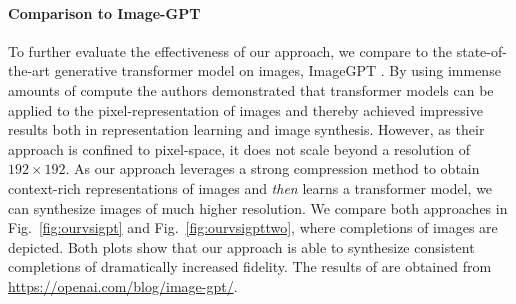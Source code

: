 \documentclass[final]{cvpr}
\begin{document}
\paragraph{Comparison to Image-GPT}
To further evaluate the effectiveness of our approach, we compare to the state-of-the-art generative transformer model on images, ImageGPT \cite{chen2020generative}. By using immense amounts of compute the authors demonstrated that transformer models can be applied to the pixel-representation of images and thereby achieved impressive results both in representation learning and image synthesis. However, as their approach is confined to pixel-space, it does not scale beyond a resolution of $192 \times 192$.
As our approach leverages a strong compression method to obtain context-rich representations of images and \emph{then} learns a transformer model, we can synthesize images of much higher resolution. We compare both approaches in Fig.~\ref{fig:ourvsigpt} and Fig.~\ref{fig:ourvsigpttwo}, where completions of images are depicted. Both plots show that our approach is able to synthesize consistent completions of dramatically increased fidelity. The results of \cite{chen2020generative} are obtained from \url{https://openai.com/blog/image-gpt/}.


\cinqualitativetwo
\cinqualitativethree
\cinqualitativebirds
\cinqualitativeone


\rejectioncin
\topkcin
\toppcin

\cinbatchthree
\cinbatchsix
\cinbatchone
\cinbatchtwo
\cinbatchfour
\cinbatchfive

\ourvsigpt
\ourvsigpttwo
\end{document}

